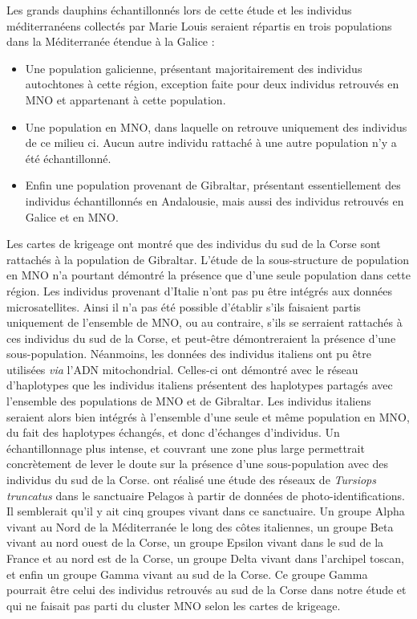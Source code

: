 \documentclass[a4paper,12pt,twoside]{article}\usepackage[]{graphicx}\usepackage[]{color}
\begin{document}
\begin {bibunit} [newbst]
Les grands dauphins échantillonnés lors de cette étude et les individus mé\-di\-ter\-ra\-né\-ens collectés par Marie Louis seraient répartis en trois populations dans la Méditerranée étendue à la Galice :
\begin{itemize}
	\item Une population galicienne, présentant majoritairement des individus autochtones à cette région, exception faite pour deux individus retrouvés en MNO et appartenant à cette population. 
	\item Une population en MNO, dans laquelle on retrouve uniquement des individus de ce milieu ci. Aucun autre individu rattaché à une autre population n'y a été échantillonné.
	\item Enfin une population provenant de Gibraltar, présentant essentiellement des individus échantillonnés en Andalousie, mais aussi des individus retrouvés en Galice et en MNO. 
\end{itemize} 

Les cartes de krigeage ont montré que des individus du sud de la Corse sont rattachés à la population de Gibraltar. L'étude de la sous-structure de population en MNO n'a pourtant démontré la présence que d'une seule population dans cette région. Les individus provenant d'Italie n'ont pas pu être intégrés aux données microsatellites. Ainsi il n'a pas été possible d'établir s'ils faisaient partis uniquement de l'ensemble de MNO, ou au contraire, s'ils se serraient rattachés à ces individus du sud de la Corse, et peut-être démontreraient la présence d'une sous-population. Néanmoins, les données des individus italiens ont pu être utilisées \emph{via} l'ADN mitochondrial. Celles-ci ont démontré avec le réseau d'haplotypes que les individus italiens présentent des haplotypes partagés avec l'ensemble des populations de MNO et de Gibraltar. Les individus italiens seraient alors bien intégrés à l'ensemble d'une seule et même population en MNO, du fait des haplotypes échangés, et donc d'échanges d'individus. Un échantillonnage plus intense, et couvrant une zone plus large permettrait concrètement de lever le doute sur la présence d'une sous-population avec des individus du sud de la Corse. \citet{carnabuci2016} ont réalisé une étude des réseaux de \emph{Tursiops truncatus} dans le sanctuaire Pelagos à partir de données de photo-identifications. Il semblerait qu'il y ait cinq groupes vivant dans ce sanctuaire. Un groupe Alpha vivant au Nord de la Méditerranée le long des côtes italiennes, un groupe Beta vivant au nord ouest de la Corse, un groupe Epsilon vivant dans le sud de la France et au nord est de la Corse, un groupe Delta vivant dans l'archipel toscan, et enfin un groupe Gamma vivant au sud de la Corse. Ce groupe Gamma pourrait être celui des individus retrouvés au sud de la Corse dans notre étude et qui ne faisait pas parti du cluster MNO selon les cartes de krigeage.


\end{bibunit}
\end{document}
